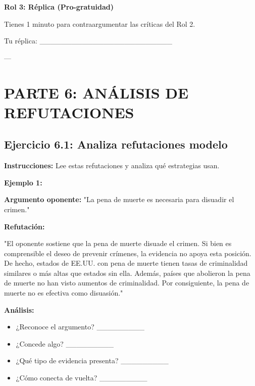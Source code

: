 \documentclass[a4paper,11pt]{article}
\begin{document}
\textbf{Rol 3: Réplica (Pro-gratuidad)}

Tienes 1 minuto para contraargumentar las críticas del Rol 2.

\vspace{0.2cm}

Tu réplica: _________________________

\vspace{0.2cm}

---

\vspace{0.2cm}

\section{PARTE 6: ANÁLISIS DE REFUTACIONES}

\vspace{0.2cm}

\subsection{Ejercicio 6.1: Analiza refutaciones modelo}

\vspace{0.2cm}

\textbf{Instrucciones:} Lee estas refutaciones y analiza qué estrategias usan.

\vspace{0.2cm}

\textbf{Ejemplo 1:}

\vspace{0.2cm}

\textbf{Argumento oponente:} "La pena de muerte es necesaria para disuadir el crimen."

\vspace{0.2cm}

\textbf{Refutación:}

"El oponente sostiene que la pena de muerte disuade el crimen. Si bien es comprensible el deseo de prevenir crímenes, la evidencia no apoya esta posición. De hecho, estados de EE.UU. con pena de muerte tienen tasas de criminalidad similares o más altas que estados sin ella. Además, países que abolieron la pena de muerte no han visto aumentos de criminalidad. Por consiguiente, la pena de muerte no es efectiva como disuasión."

\vspace{0.2cm}

\textbf{Análisis:}

\begin{itemize}

  \item ¿Reconoce el argumento? _________

  \item ¿Concede algo? _________

  \item ¿Qué tipo de evidencia presenta? _________

  \item ¿Cómo conecta de vuelta? _________

\end{itemize}
\end{document}
